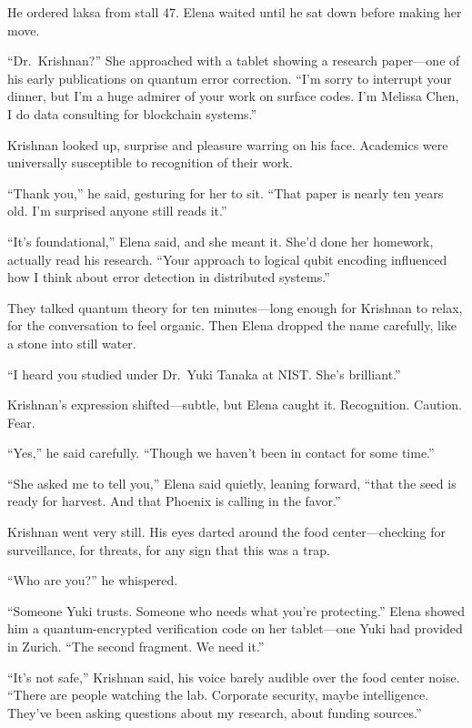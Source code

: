 He ordered laksa from stall 47. Elena waited until he sat down before
making her move.

``Dr.~Krishnan?'' She approached with a tablet showing a research
paper---one of his early publications on quantum error correction. ``I'm
sorry to interrupt your dinner, but I'm a huge admirer of your work on
surface codes. I'm Melissa Chen, I do data consulting for blockchain
systems.''

Krishnan looked up, surprise and pleasure warring on his face. Academics
were universally susceptible to recognition of their work.

``Thank you,'' he said, gesturing for her to sit. ``That paper is nearly
ten years old. I'm surprised anyone still reads it.''

``It's foundational,'' Elena said, and she meant it. She'd done her
homework, actually read his research. ``Your approach to logical qubit
encoding influenced how I think about error detection in distributed
systems.''

They talked quantum theory for ten minutes---long enough for Krishnan to
relax, for the conversation to feel organic. Then Elena dropped the name
carefully, like a stone into still water.

``I heard you studied under Dr.~Yuki Tanaka at NIST. She's brilliant.''

Krishnan's expression shifted---subtle, but Elena caught it.
Recognition. Caution. Fear.

``Yes,'' he said carefully. ``Though we haven't been in contact for some
time.''

``She asked me to tell you,'' Elena said quietly, leaning forward,
``that the seed is ready for harvest. And that Phoenix is calling in the
favor.''

Krishnan went very still. His eyes darted around the food
center---checking for surveillance, for threats, for any sign that this
was a trap.

``Who are you?'' he whispered.

``Someone Yuki trusts. Someone who needs what you're protecting.'' Elena
showed him a quantum-encrypted verification code on her tablet---one
Yuki had provided in Zurich. ``The second fragment. We need it.''

``It's not safe,'' Krishnan said, his voice barely audible over the food
center noise. ``There are people watching the lab. Corporate security,
maybe intelligence. They've been asking questions about my research,
about funding sources.''

